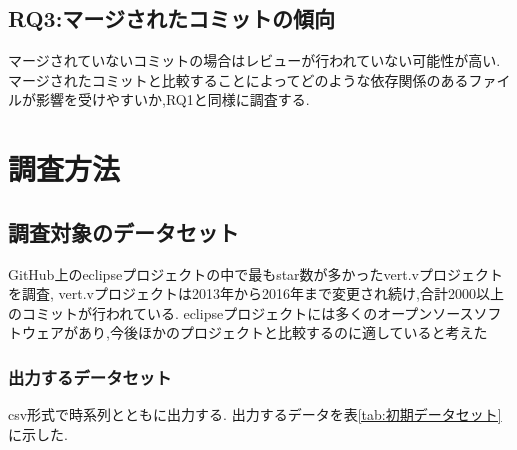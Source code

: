 \documentclass[submit,ses,noauthor]{ipsj} %
\begin{document}
\subsection{RQ3:マージされたコミットの傾向}
マージされていないコミットの場合はレビューが行われていない可能性が高い.
マージされたコミットと比較することによってどのような依存関係のあるファイルが影響を受けやすいか,RQ1と同様に調査する.


\section{調査方法}\label{調査方法}


\subsection{調査対象のデータセット}
GitHub上のeclipseプロジェクトの中で最もstar数が多かったvert.vプロジェクトを調査,
vert.vプロジェクトは2013年から2016年まで変更され続け,合計2000以上のコミットが行われている.
eclipseプロジェクトには多くのオープンソースソフトウェアがあり,今後ほかのプロジェクトと比較するのに適していると考えた


\subsubsection{出力するデータセット}
csv形式で時系列とともに出力する.
出力するデータを表\ref{tab:初期データセット}に示した.
\end{document}
